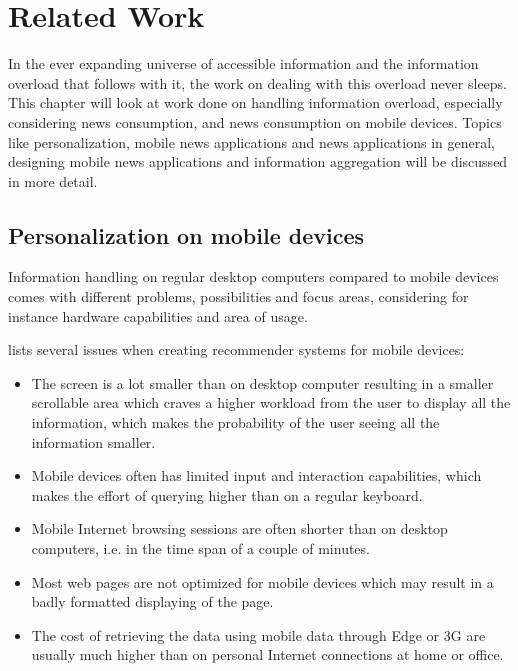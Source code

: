 \chapter{Related Work}
\label{chapter_related_work}
In the ever expanding universe of accessible information and the information overload that follows with it, the work on dealing with this overload never sleeps. This chapter will look at work done on handling information overload, especially considering news consumption, and news consumption on mobile devices. Topics like personalization, mobile news applications and news applications in general, designing mobile news applications and information aggregation will be discussed in more detail.

\section{Personalization on mobile devices}

Information handling on regular desktop computers compared to mobile devices comes with different problems, possibilities and focus areas, considering for instance hardware capabilities and area of usage. 


\cite{ricci2010mobile} lists several issues when creating recommender systems for mobile devices:

\begin{itemize}

\item The screen is a lot smaller than on desktop computer resulting in a smaller scrollable area which craves a higher workload from the user to display all the information, which makes the probability of the user seeing all the information smaller.

\item Mobile devices often has limited input and interaction capabilities, which makes the effort of querying higher than on a regular keyboard.

\item Mobile Internet browsing sessions are often shorter than on desktop computers, i.e. in the time span of a couple of minutes.

\item Most web pages are not optimized for mobile devices which may result in a badly formatted displaying of the page.

\item The cost of retrieving the data using mobile data through Edge or 3G are usually much higher than on personal Internet connections at home or office.
\end{itemize}

